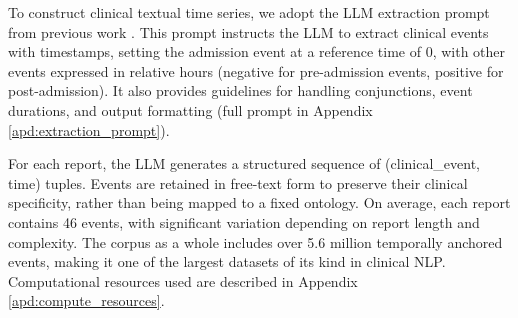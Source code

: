 To construct clinical textual time series, we adopt the LLM extraction prompt from previous work \citep{wang2025large,noroozizadeh2025reconstructing}. This prompt instructs the LLM to extract clinical events with timestamps, setting the admission event at a reference time of 0, with other events expressed in relative hours (negative for pre-admission events, positive for post-admission). It also provides guidelines for handling conjunctions, event durations, and output formatting (full prompt in Appendix \ref{apd:extraction_prompt}).

For each report, the LLM generates a structured sequence of (clinical\_event, time) tuples. Events are retained in free-text form to preserve their clinical specificity, rather than being mapped to a fixed ontology. On average, each report contains 46 events, with significant variation depending on report length and complexity. The corpus as a whole includes over 5.6 million temporally anchored events, making it one of the largest datasets of its kind in clinical NLP.
Computational resources used are described in Appendix \ref{apd:compute_resources}.







